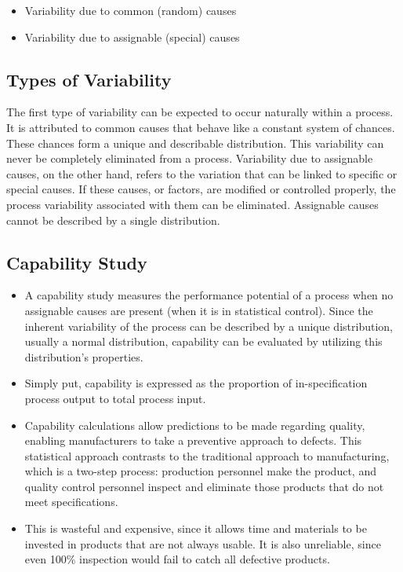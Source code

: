 \documentclass[SPC-MASTER.tex]{subfiles}
\begin{document}
\begin{itemize}
\item Variability due to common (random) causes
\item Variability due to assignable (special) causes
\end{itemize}
\subsection{Types of Variability}
The first type of variability can be expected to occur naturally within a process. It is attributed to common causes that behave like a constant system of chances. These chances form a unique and describable distribution. This variability can never be completely eliminated from a process. Variability due to assignable causes, on the other hand, refers to the variation that can be linked to specific or special causes. If these causes, or factors, are modified or controlled properly, the process variability associated with them can be eliminated. Assignable causes cannot be described by a single distribution.
\newpage
\subsection{Capability Study} 
\large
\begin{itemize}
\item A capability study measures the performance potential of a process when no assignable causes are present (when it is in statistical control). Since the inherent variability of the process can be described by a unique distribution, usually a normal distribution, capability can be evaluated by utilizing this distribution’s properties. 
\item Simply put, capability is expressed as the proportion of in-specification process output to total process input.

\item Capability calculations allow predictions to be made regarding quality, enabling manufacturers to take a preventive approach to defects. This statistical approach contrasts to the traditional approach to manufacturing, which is a two-step process: production personnel make the product, and quality control personnel inspect and eliminate those products that do not meet specifications. \item This is wasteful and expensive, since it allows time and materials to be invested in products that are not always usable. It is also unreliable, since even 100\% inspection would fail to catch all defective products.
\end{itemize}
\end{document}
